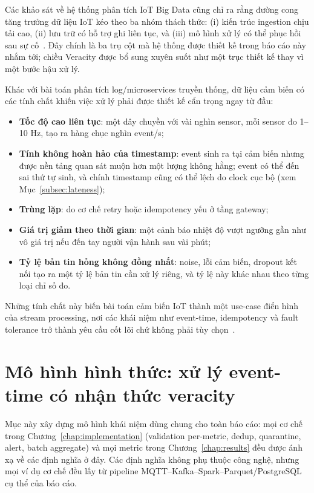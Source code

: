 Các khảo sát về hệ thống phân tích IoT Big Data cũng chỉ ra rằng đường cong
tăng trưởng dữ liệu IoT kéo theo ba nhóm thách thức: (i) kiến trúc ingestion
chịu tải cao, (ii) lưu trữ có hỗ trợ ghi liên tục, và (iii) mô hình xử lý có
thể phục hồi sau sự cố~\cite{iot_big_data_survey_2022}. Đây chính là ba trụ
cột mà hệ thống được thiết kế trong báo cáo này nhắm tới; chiều Veracity
được bổ sung xuyên suốt như một trục thiết kế thay vì một bước hậu xử lý.

Khác với bài toán phân tích log/microservices truyền thống, dữ liệu cảm biến
có các tính chất khiến việc xử lý phải được thiết kế cẩn trọng ngay từ đầu:

\begin{itemize}
  \item \textbf{Tốc độ cao liên tục}: một dây chuyền với vài nghìn sensor,
        mỗi sensor đo 1--10 Hz, tạo ra hàng chục nghìn event/s;
  \item \textbf{Tính không hoàn hảo của timestamp}: event sinh ra tại cảm biến
        nhưng được nền tảng quan sát muộn hơn một lượng không hằng; event có
        thể đến sai thứ tự sinh, và chính timestamp cũng có thể lệch do clock
        cục bộ (xem Mục~\ref{subsec:lateness});
  \item \textbf{Trùng lặp}: do cơ chế retry hoặc idempotency yếu ở tầng gateway;
  \item \textbf{Giá trị giảm theo thời gian}: một cảnh báo nhiệt độ vượt ngưỡng
        gần như vô giá trị nếu đến tay người vận hành sau vài phút;
  \item \textbf{Tỷ lệ bản tin hỏng không đồng nhất}: noise, lỗi cảm biến,
        dropout kết nối tạo ra một tỷ lệ bản tin cần xử lý riêng, và tỷ lệ
        này khác nhau theo từng loại chỉ số đo.
\end{itemize}

Những tính chất này biến bài toán cảm biến IoT thành một use-case điển hình
của stream processing, nơi các khái niệm như event-time, idempotency và
fault tolerance trở thành yêu cầu cốt lõi
chứ không phải tùy chọn~\cite{iot_stream_latency_2021}.

\section{Mô hình hình thức: xử lý event-time có nhận thức veracity}
\label{sec:theory}

Mục này xây dựng mô hình khái niệm dùng chung cho toàn báo cáo: mọi cơ chế
trong Chương~\ref{chap:implementation} (validation per-metric, dedup,
quarantine, alert, batch aggregate) và mọi metric trong
Chương~\ref{chap:results} đều được ánh xạ về các định nghĩa ở đây. Các định
nghĩa không phụ thuộc công nghệ, nhưng mọi ví dụ cơ chế đều lấy từ pipeline
MQTT--Kafka--Spark--Parquet/PostgreSQL cụ thể của báo cáo.

